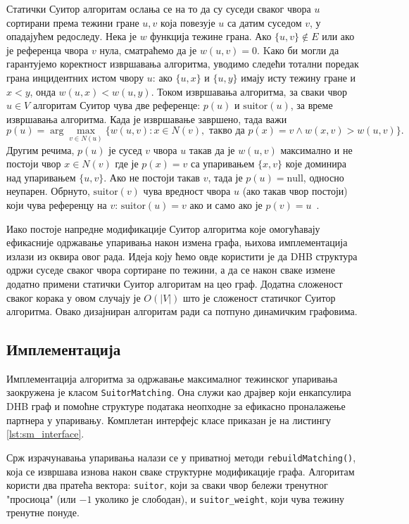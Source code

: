 Статички Суитор алгоритам ослања се на то да су суседи сваког чвора $u$ сортирани према тежини гране ${u,v}$ која повезује $u$ са датим суседом $v$, у опадајућем редоследу.  Нека је $w$ функција тежине грана. Ако $\{u, v\} \notin E$ или ако је референца чвора $v$ нула, сматраћемо да је $w(u, v) = 0$. Kако би могли да гарантујемо коректност извршавања алгоритма, уводимо следећи тотални поредак грана инцидентних истом чвору $u$: ако $\{u, x\}$ и $\{u, y\}$ имају исту тежину гране и $x < y$, онда $w(u, x) < w(u, y)$.  Током извршавања алгоритма, за сваки чвор $u \in V$ алгоритам Суитор чува две референце: $p(u)$ и $\text{suitor}(u)$, за време извршавања алгоритма. Када је извршавање завршено, тада важи
\[
p(u) = \arg\max_{v \in N(u)} \{w(u, v) : x \in N(v), \text{ такво да } p(x) = v \land w(x, v) > w(u, v)\}.
\]
Другим речима, $p(u)$ је сусед $v$ чвора $u$ такав да је $w(u, v)$ максимално и не постоји чвор $x \in N(v)$ где је $p(x) = v$ са упаривањем $\{x, v\}$ које доминира над упаривањем $\{u, v\}$. Ако не постоји такав $v$, тада је $p(u) = \text{null}$, односно неупарен. Обрнуто, $\text{suitor}(v)$ чува вредност чвора $u$ (ако такав чвор постоји) који чува референцу на $v$: $\text{suitor}(u) = v$ ако и само ако је $p(v) = u$~\cite{angrimanBatchdynamicSuitorAlgorithm2022}.

Иако постоје напредне модификације Суитор алгоритма које омогућавају ефикасније одржавање упаривања након измена графа, њихова имплементација излази из оквира овог рада. Идеја коју ћемо овде користити је да DHB структура одржи суседе сваког чвора сортиране по тежини, а да се након сваке измене додатно примени статички Суитор алгоритам на цео граф. Додатна сложеност сваког корака у овом случају је $O(|V|)$ што је сложеност статичког Суитор алгоритма. Овако дизајниран алгоритам ради са потпуно динамичким графовима. 

\subsection{Имплементација}

Имплементација алгоритма за одржавање максималног тежинског упаривања заокружена је класом \texttt{SuitorMatching}. Она служи као драјвер који енкапсулира DHB граф и помоћне структуре података неопходне за ефикасно проналажење партнера у упаривању. Комплетан интерфејс класе приказан је на листингу \ref{lst:sm_interface}.

Срж израчунавања упаривања налази се у приватној методи \texttt{rebuild\allowbreak{}Matching()}, која се извршава изнова након сваке структурне модификације графа. Алгоритам користи два пратећа вектора: \texttt{suitor}, који за сваки чвор бележи тренутног "просиоца" (или $-1$ уколико је слободан), и \texttt{suitor\_weight}, који чува тежину тренутне понуде.

